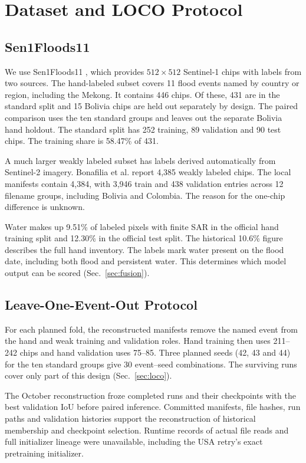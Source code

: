 \section{Dataset and LOCO Protocol}
\label{sec:dataset}

\subsection{Sen1Floods11}

We use Sen1Floods11 \cite{bonafilia2020}, which provides $512\times512$
Sentinel-1 chips with labels from two sources. The hand-labeled subset
covers 11 flood events named by country or region, including the Mekong.
It contains 446 chips. Of these, 431 are in the standard split and 15
Bolivia chips are held out separately by design. The paired comparison
uses the ten standard groups and leaves out the separate Bolivia hand
holdout. The standard split has 252 training, 89 validation and 90 test
chips. The training share is 58.47\% of 431.

A much larger weakly labeled subset has labels derived automatically from
Sentinel-2 imagery. Bonafilia et al. report 4,385 weakly labeled chips.
The local manifests contain 4,384, with 3,946 train and 438 validation
entries across 12 filename groups, including Bolivia and Colombia. The
reason for the one-chip difference is unknown.

Water makes up 9.51\% of labeled pixels with finite SAR in the official
hand training split and 12.30\% in the official test split. The historical
10.6\% figure describes the full hand inventory. The labels mark water
present on the flood date, including both flood and persistent water.
This determines which model output can be scored (Sec.~\ref{sec:fusion}).

\subsection{Leave-One-Event-Out Protocol}
\label{sec:protocol}

For each planned fold, the reconstructed manifests remove the named
event from the hand and weak training and validation roles. Hand training
then uses 211--242 chips and hand validation uses 75--85. Three planned
seeds (42, 43 and 44) for the ten standard groups give 30 event--seed
combinations. The surviving runs cover only part of this design
(Sec.~\ref{sec:loco}).

The October reconstruction froze completed runs and their
checkpoints with the best validation IoU before paired inference. Committed
manifests, file hashes, run paths and validation histories support the
reconstruction of historical membership and checkpoint selection.
Runtime records of actual file reads and full initializer lineage were
unavailable, including the USA retry's exact pretraining initializer.


